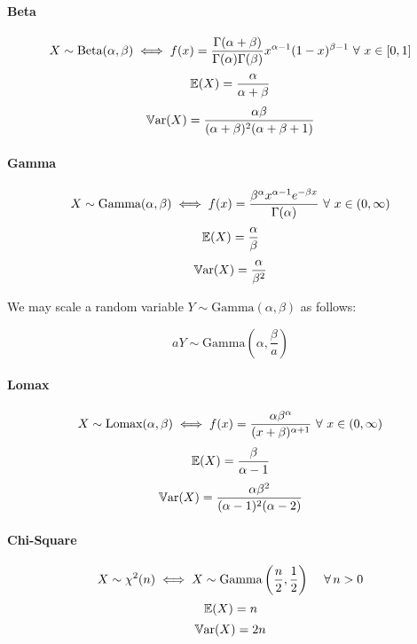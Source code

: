 \documentclass[a4paper]{article}
\begin{document}
            \paragraph{Beta}
                \[
                    X \sim \text{Beta}(\alpha, \beta) \iff f(x) =
                    \frac{\Gamma(\alpha + \beta)}{\Gamma(\alpha)\Gamma(\beta)}
                    x^{\alpha - 1}(1 - x)^{\beta - 1} \,\,\forall\,\, x \in [0, 1]
                \]
                \[
                    \mathbb{E}(X) = \frac{\alpha}{\alpha + \beta}
                \]
                \[
                    \mathbb{V}\text{ar}(X) = \frac{\alpha\beta}{(\alpha + \beta)^2(\alpha +
                    \beta + 1)}
                \]

            \paragraph{Gamma}
                \[
                    X \sim \text{Gamma}(\alpha, \beta) \iff f(x) =
                    \frac{\beta^\alpha x^{\alpha - 1}e^{-\beta x}}
                    {\Gamma(\alpha)} \,\,\forall\,\, x \in (0, \infty)
                \]
                \[
                    \mathbb{E}(X) = \frac{\alpha}{\beta}
                \]
                \[
                    \mathbb{V}\text{ar}(X) = \frac{\alpha}{\beta^2}
                \]

                We may scale a random variable $Y \sim \text{Gamma}(\alpha,
                \beta)$ as follows:

                \[
                    aY \sim \text{Gamma}\left(\alpha, \frac{\beta}{a}
                    \right)
                \]

            \paragraph{Lomax}
                \[
                    X \sim \text{Lomax}(\alpha, \beta) \iff f(x) =
                    \frac{\alpha\beta^\alpha}{(x + \beta)^{\alpha + 1}} \,\,\forall\,\,
                    x \in (0, \infty)
                \]
                \[
                    \mathbb{E}(X) = \frac{\beta}{\alpha - 1}
                \]
                \[
                    \mathbb{V}\text{ar}(X) = \frac{\alpha\beta^2}{(\alpha - 1)^2(\alpha - 2)}
                \]

            \paragraph{Chi-Square}
                \[
                    X \sim \chi^2(n) \iff X \sim \text{Gamma}\left(\frac{n}{2},
                    \frac{1}{2}\right) \quad \,\forall\, n > 0
                \]
                \[
                    \mathbb{E}(X) = n
                \]
                \[
                    \mathbb{V}\text{ar}(X) = 2n
                \]
\end{document}
